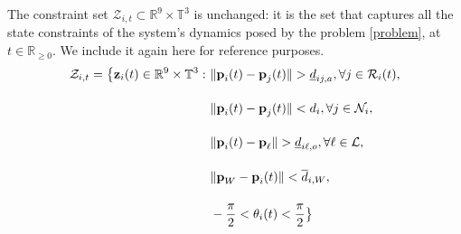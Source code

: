 The constraint set $\mathcal{Z}_{i,t} \subset \mathbb{R}^{9} \times \mathbb{T}^3$
is unchanged: it is the set that captures all the state constraints of
the system's dynamics posed by the problem \eqref{problem},
at $t \in \mathbb{R}_{\geq 0}$. We include it again here for reference
purposes.
\begin{align}
  \mathcal{Z}_{i,t} = \big\{\bm{\mathbf{z}}_i(t) \in \mathbb{R}^{9}\times \mathbb{T}^3 : \
      & \|\bm{\mathbf{p}}_i(t) - \bm{\mathbf{p}}_j(t)\| > \underline{d}_{ij,a}, \forall j \in \mathcal{R}_i(t), \label{constraint:p_1_2}\\[2.5ex]
      & \|\bm{\mathbf{p}}_i(t) - \bm{\mathbf{p}}_j(t)\| < d_i, \forall j \in \mathcal{N}_i, \\[2.5ex]
      & \|\bm{\mathbf{p}}_i(t) - \bm{\mathbf{p}}_{\ell}\| > \underline{d}_{i\ell,o}, \forall \ell \in \mathcal{L}, \\[2.5ex]
      & \|\bm{\mathbf{p}}_W - \bm{\mathbf{p}}_i(t)\| < \overline{d}_{i,W}, \\[2.5ex]
      & - \frac{\pi}{2} < \theta_i(t) < \frac{\pi}{2} \label{constraint:p_5_2}\big\}
\end{align}
